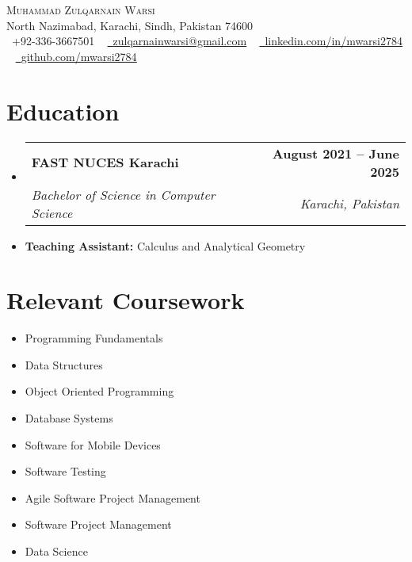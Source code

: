 \documentclass[letterpaper,11pt]{article}
\makeatletter
\newcommand{\resumeItem}[1]{
  \item\small{
    {#1 \vspace{-2pt}}
  }
}
\newcommand{\resumeSubheading}[4]{
  \vspace{-2pt}\item
    \begin{tabular*}{1.0\textwidth}[t]{l@{\extracolsep{\fill}}r}
      \textbf{#1} & \textbf{\small #2} \\
      \textit{\small#3} & \textit{\small #4} \\
    \end{tabular*}\vspace{-7pt}
}
\newcommand{\sectionspace}{\vspace{-10pt}}
\newcommand{\resumeSubHeadingListStart}{\begin{itemize}[leftmargin=0.0in, label={}]}
\newcommand{\resumeSubHeadingListEnd}{\end{itemize}}
\makeatother
\begin{document}
\begin{center}
    {\Huge \scshape Muhammad Zulqarnain Warsi} \\ \vspace{1pt}
    North Nazimabad, Karachi, Sindh, Pakistan 74600 \\ \vspace{1pt}
    \small \raisebox{-0.1\height}\faPhone\ +92-336-3667501 ~ \href{mailto:zulqarnainwarsi@gmail.com}{\raisebox{-0.2\height}\faEnvelope\  \underline{zulqarnainwarsi@gmail.com}} ~ 
    \href{https://linkedin.com/in/mwarsi2784/}{\raisebox{-0.2\height}\faLinkedin\ \underline{linkedin.com/in/mwarsi2784}}  ~
    \href{https://github.com/mwarsi2784}{\raisebox{-0.2\height}\faGithub\ \underline{github.com/mwarsi2784}}
    \vspace{-8pt}
\end{center}


\sectionspace


\section{Education}
  \resumeSubHeadingListStart
    \resumeSubheading
      {FAST NUCES Karachi}{August 2021 -- June 2025}
      {Bachelor of Science in Computer Science} {Karachi, Pakistan}
      \resumeItem{\textbf{Teaching Assistant:} Calculus and Analytical Geometry}
  \resumeSubHeadingListEnd
\sectionspace


\section{Relevant Coursework}
    \begin{multicols}{3}
        \begin{itemize}[itemsep=-5pt, parsep=3pt]
            \item \small Programming Fundamentals
            \item \small Data Structures
            \item \small Object Oriented Programming
            \item \small Database Systems	
            \item \small Software for Mobile Devices
            \item \small Software Testing
            \item \small Agile Software Project Management
            \item \small Software Project Management
            \item \small Data Science
        \end{itemize}
    \end{multicols}
    \vspace{10pt}
    \vspace*{2.0\multicolsep}
\vspace{-5pt}
\end{document}
